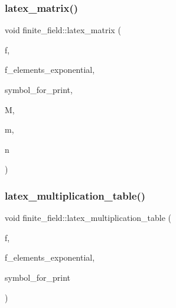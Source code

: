 \mbox{\label{classfinite__field_a880ac4f2543d10420ee5f85b1eaf88d7}} 
\subsubsection{\texorpdfstring{latex\+\_\+matrix()}{latex\_matrix()}}
{\footnotesize\ttfamily void finite\+\_\+field\+::latex\+\_\+matrix (\begin{DoxyParamCaption}\item[{ostream \&}]{f,  }\item[{\mbox{\hyperlink{galois_8h_a09fddde158a3a20bd2dcadb609de11dc}{I\+NT}}}]{f\+\_\+elements\+\_\+exponential,  }\item[{const \mbox{\hyperlink{galois_8h_ab6cc7b4aeb6ea31aba2b3fbfc83ff5e6}{B\+Y\+TE}} $\ast$}]{symbol\+\_\+for\+\_\+print,  }\item[{\mbox{\hyperlink{galois_8h_a09fddde158a3a20bd2dcadb609de11dc}{I\+NT}} $\ast$}]{M,  }\item[{\mbox{\hyperlink{galois_8h_a09fddde158a3a20bd2dcadb609de11dc}{I\+NT}}}]{m,  }\item[{\mbox{\hyperlink{galois_8h_a09fddde158a3a20bd2dcadb609de11dc}{I\+NT}}}]{n }\end{DoxyParamCaption})}

\mbox{\label{classfinite__field_a1d35a34d25d5d38a60f67ae7e5dbb4c7}} 
\subsubsection{\texorpdfstring{latex\+\_\+multiplication\+\_\+table()}{latex\_multiplication\_table()}}
{\footnotesize\ttfamily void finite\+\_\+field\+::latex\+\_\+multiplication\+\_\+table (\begin{DoxyParamCaption}\item[{ostream \&}]{f,  }\item[{\mbox{\hyperlink{galois_8h_a09fddde158a3a20bd2dcadb609de11dc}{I\+NT}}}]{f\+\_\+elements\+\_\+exponential,  }\item[{const \mbox{\hyperlink{galois_8h_ab6cc7b4aeb6ea31aba2b3fbfc83ff5e6}{B\+Y\+TE}} $\ast$}]{symbol\+\_\+for\+\_\+print }\end{DoxyParamCaption})}

